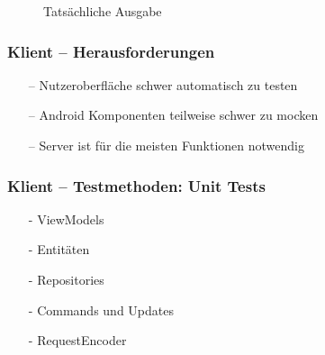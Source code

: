 \documentclass[aspectratio=1610]{beamer}
\begin{document}
\begin{frame}[plain]
\begin{minipage}{0.45\textwidth}
{\begin{figure}
                    \caption{Tatsächliche Ausgabe}
                \end{figure}
            }
        \end{minipage}
    \end{frame}


	\begin{frame}[plain]
        \frametitle{\textbf{Klient} -- Herausforderungen}

        \begin{itemize}
          \item[--] Nutzeroberfläche schwer automatisch zu testen
          \item[--] Android Komponenten teilweise schwer zu mocken
          \item[--] Server ist für die meisten Funktionen notwendig
        \end{itemize}
  \end{frame}

\begin{frame}[plain]
        \frametitle{\textbf{Klient} -- Testmethoden: Unit Tests}

        \begin{itemize}
          \item[-] ViewModels
          \item[-] Entitäten
          \item[-] Repositories
          \item[-] Commands und Updates
          \item[-] RequestEncoder
        \end{itemize}
  \end{frame}
\end{document}
